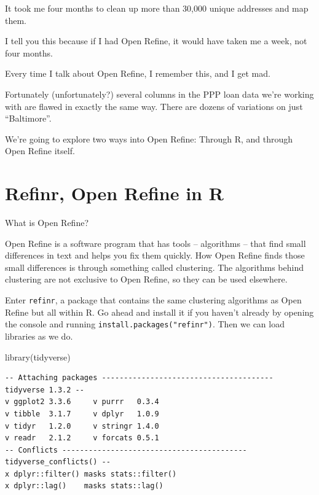 \documentclass[
  letterpaper,
  DIV=11,
  numbers=noendperiod]{scrreprt}
\newenvironment{Shaded}{\begin{snugshade}}{\end{snugshade}}
\newcommand{\FunctionTok}[1]{\textcolor[rgb]{0.28,0.35,0.67}{#1}}
\newcommand{\NormalTok}[1]{\textcolor[rgb]{0.00,0.23,0.31}{#1}}
\begin{document}
It took me four months to clean up more than 30,000 unique addresses and
map them.

I tell you this because if I had Open Refine, it would have taken me a
week, not four months.

Every time I talk about Open Refine, I remember this, and I get mad.

Fortunately (unfortunately?) several columns in the PPP loan data we're
working with are flawed in exactly the same way. There are dozens of
variations on just ``Baltimore''.

We're going to explore two ways into Open Refine: Through R, and through
Open Refine itself.

\hypertarget{refinr-open-refine-in-r}{%
\section{Refinr, Open Refine in R}\label{refinr-open-refine-in-r}}

What is Open Refine?

Open Refine is a software program that has tools -- algorithms -- that
find small differences in text and helps you fix them quickly. How Open
Refine finds those small differences is through something called
clustering. The algorithms behind clustering are not exclusive to Open
Refine, so they can be used elsewhere.

Enter \texttt{refinr}, a package that contains the same clustering
algorithms as Open Refine but all within R. Go ahead and install it if
you haven't already by opening the console and running
\texttt{install.packages("refinr")}. Then we can load libraries as we
do.

\begin{Shaded}
\begin{Highlighting}[]
\FunctionTok{library}\NormalTok{(tidyverse)}
\end{Highlighting}
\end{Shaded}

\begin{verbatim}
-- Attaching packages --------------------------------------- tidyverse 1.3.2 --
v ggplot2 3.3.6     v purrr   0.3.4
v tibble  3.1.7     v dplyr   1.0.9
v tidyr   1.2.0     v stringr 1.4.0
v readr   2.1.2     v forcats 0.5.1
-- Conflicts ------------------------------------------ tidyverse_conflicts() --
x dplyr::filter() masks stats::filter()
x dplyr::lag()    masks stats::lag()
\end{verbatim}
\end{document}
